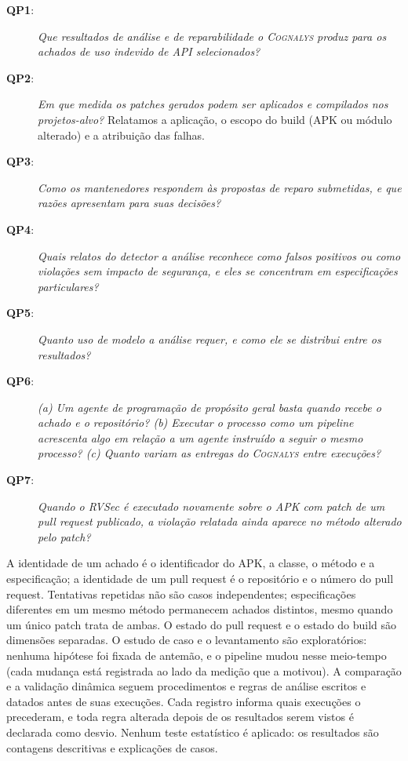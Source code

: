 \documentclass[conference]{IEEEtran}
\newcommand{\system}{\textsc{Cognalys}}
\newcommand{\researchq}[1]{\textbf{QP#1}}
\begin{document}
\begin{description}
  \item[\researchq{1}:] \emph{Que resultados de análise e de reparabilidade
  o {\system} produz para os achados de uso indevido de API selecionados?}

\item[\researchq{2}:] \emph{Em que medida os patches gerados podem ser
  aplicados e compilados nos projetos-alvo?}
  Relatamos a aplicação, o escopo do build (APK ou módulo alterado) e a atribuição
  das falhas.

  \item[\researchq{3}:] \emph{Como os mantenedores respondem às propostas de reparo
  submetidas, e que razões apresentam para suas decisões?}

  \item[\researchq{4}:] \emph{Quais relatos do detector a análise
  reconhece como falsos positivos ou como violações sem impacto de segurança,
  e eles se concentram em especificações particulares?}

  \item[\researchq{5}:] \emph{Quanto uso de modelo a análise
  requer, e como ele se distribui entre os resultados?}

\item[\researchq{6}:] \emph{(a) Um agente de programação de propósito geral basta quando
  recebe o achado e o repositório? (b) Executar o processo como um
  pipeline acrescenta algo em relação a um agente instruído a seguir o mesmo processo?
  (c) Quanto variam as entregas do {\system} entre execuções?}

  \item[\researchq{7}:] \emph{Quando o RVSec é executado novamente sobre o APK com patch de um
  pull request publicado, a violação relatada ainda aparece no
  método alterado pelo patch?}
\end{description}

A identidade de um achado é o identificador do APK, a classe, o método e a especificação; a
identidade de um pull request é o repositório e o número do pull request. Tentativas repetidas não são casos
independentes; especificações diferentes em um mesmo método permanecem achados distintos, mesmo
quando um único patch trata de ambas. O estado do pull request e o estado do build são dimensões
separadas. O estudo de caso e o levantamento são exploratórios: nenhuma hipótese foi
fixada de antemão, e o pipeline mudou nesse meio-tempo (cada mudança está registrada
ao lado da medição que a motivou). A comparação e a validação
dinâmica seguem procedimentos e regras de análise escritos e datados
antes de suas execuções. Cada registro informa quais execuções
o precederam, e toda regra alterada depois de os resultados serem vistos é declarada como
desvio. Nenhum teste estatístico é aplicado: os resultados são contagens descritivas e
explicações de casos.
\end{document}
